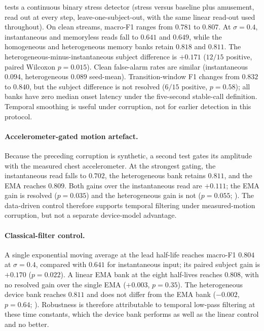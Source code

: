 \documentclass[12pt, twoside]{report}
\begin{document}
 tests a continuous binary stress detector (stress versus baseline plus amusement, read out at every step, leave-one-subject-out, with the same linear read-out used throughout). On clean streams, macro-F1 ranges from $0.781$ to $0.807$. At $\sigma=0.4$, instantaneous and memoryless reads fall to $0.641$ and $0.649$, while the homogeneous and heterogeneous memory banks retain $0.818$ and $0.811$. The heterogeneous-minus-instantaneous subject difference is $+0.171$ ($12/15$ positive, paired Wilcoxon $p=0.015$). Clean false-alarm rates are similar (instantaneous $0.094$, heterogeneous $0.089$ seed-mean). Transition-window F1 changes from $0.832$ to $0.840$, but the subject difference is not resolved ($6/15$ positive, $p=0.58$); all banks have zero median onset latency under the five-second stable-call definition. Temporal smoothing is useful under corruption, not for earlier detection in this protocol.

\paragraph{Accelerometer-gated motion artefact.} Because the preceding corruption is synthetic, a second test gates its amplitude with the measured chest accelerometer. At the strongest gating, the instantaneous read falls to $0.702$, the heterogeneous bank retains $0.811$, and the EMA reaches $0.809$. Both gains over the instantaneous read are $+0.111$; the EMA gain is resolved ($p=0.035$) and the heterogeneous gain is not ($p=0.055$; ). The data-driven control therefore supports temporal filtering under measured-motion corruption, but not a separate device-model advantage.

\paragraph{Classical-filter control.} A single exponential moving average at the lead half-life reaches macro-F1 $0.804$ at $\sigma=0.4$, compared with $0.641$ for instantaneous input; its paired subject gain is $+0.170$ ($p=0.022$). A linear EMA bank at the eight half-lives reaches $0.808$, with no resolved gain over the single EMA ($+0.003$, $p=0.35$). The heterogeneous device bank reaches $0.811$ and does not differ from the EMA bank ($-0.002$, $p=0.64$; ). Robustness is therefore attributable to temporal low-pass filtering at these time constants, which the device bank performs as well as the linear control and no better.
\end{document}
